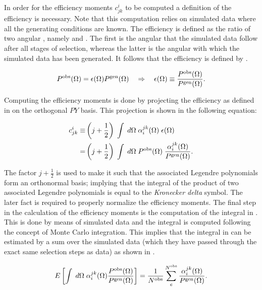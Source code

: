 In order for the efficiency moments $c^i_{jk}$ to be computed a definition of the efficiency is necessary. Note that this computation relies on
simulated data where all the generating conditions are known. The efficiency is defined as the ratio of two angular \pdfs, namely
\Pobs and \Pgen. The first is the angular \pdf that the simulated data follow after all stages of selection, whereas
the latter is the angular \pdf with which the simulated data has been generated.
It follows that the efficiency is defined by .

\begin{equation}
  \centering
  \Pobs = \epsilon(\Omega) \Pgen \quad \Rightarrow \quad \epsilon(\Omega) \equiv \frac{\Pobs}{\Pgen}.
  \label{eff_def}
\end{equation}

\noindent Computing the efficiency moments is done by projecting the efficiency as defined in 
on the orthogonal $PY$ basis. This projection is shown in the following equation:

\begin{align}
  \centering
   c^i_{jk}  \equiv & \parenthesis{j + \frac{1}{2}} \; \int \; d\Omega \; \effbase \; \epsilon(\Omega) \nonumber \\
                 =  & \parenthesis{j + \frac{1}{2}} \; \int \; d\Omega \; \Pobs \; \frac{\effbase}{\Pgen}.
  \label{eff_moms_def}
\end{align}

\noindent The factor $j+\frac{1}{2}$ is used to make it such that the associated Legendre polynomials form an
orthonormal basis; implying that the integral of the product of two associated Legendre polynomials is equal
to the {\it Kronecker delta} symbol. The later fact is required to properly normalize the efficiency moments.
The final step in the calculation of the efficiency moments is the computation of the integral in .
This is done by means of simulated data and the integral is computed following the concept of Monte Carlo integration. This implies
that the integral in  can be estimated by a sum over the simulated data (which they have passed through the exact
same selection steps as data) as shown in .

\begin{equation}
\centering
  E\left[ \int \; d\Omega \; \effbase \frac{\Pobs}{\Pgen} \right] = \frac{1}{\Nobs} \sum_e^{\Nobs} \frac{\effbase}{\Pgen}.
  \label{eff_moms_calc}
\end{equation}

